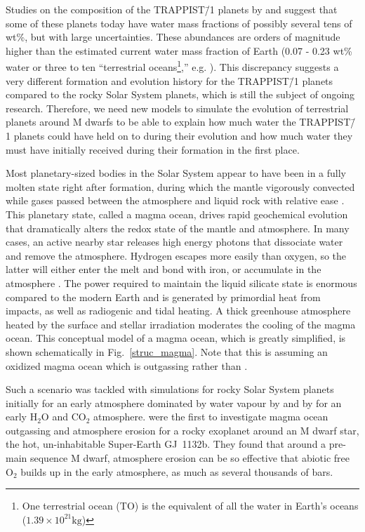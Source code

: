 \documentclass[paper=letterpaper,fontsize=12pt,oneside,twocolumn]{article}
\newcommand{\eg}{e.g. }
\begin{document}
Studies on the composition of the TRAPPIST\=/1 planets by \citet{Dorn2018} and \citet{Unterborn2018} suggest that some of these planets today have water mass fractions of possibly several tens of wt\%, but with large uncertainties. These abundances are orders of magnitude higher than the estimated current water mass fraction of Earth (0.07 - 0.23 wt\% water or three to ten ``terrestrial oceans\footnote{One terrestrial ocean (TO) is the equivalent of all the water in Earth's oceans ($1.39 \times 10^{21} \si{\kilogram}$)},'' \eg \citet{Elkins-Tanton2008,Pearson2014,Schmandt1265}). This discrepancy suggests a very different formation and evolution history for the TRAPPIST\=/1 planets compared to the rocky Solar System planets, which is still the subject of ongoing research.
Therefore, we need new models to simulate the evolution of terrestrial planets around M dwarfs to be able to explain how much water the TRAPPIST\=/1 planets could have held on to during their evolution and how much water they must have initially received during their formation in the first place.

Most planetary-sized bodies in the Solar System appear to have been in a fully molten state right after formation, during which the mantle vigorously convected while gases passed between the atmosphere and liquid rock with relative ease \citep{Wood1970, Solomon1979, Wetherill1990, Lammer2018A}. 
This planetary state, called a magma ocean, drives rapid geochemical evolution that dramatically alters the redox state of the mantle and atmosphere. 
In many cases, an active nearby star releases high energy photons that dissociate water and remove the atmosphere. Hydrogen escapes more easily than oxygen, so the latter will either enter the melt and bond with iron, or accumulate in the atmosphere \citep[\eg][]{Luger2015a}. The power required to maintain the liquid silicate state is enormous compared to the modern Earth and is generated by primordial heat from impacts, as well as radiogenic and tidal heating. A thick greenhouse atmosphere heated by the surface and stellar irradiation moderates the cooling of the magma ocean. This conceptual model of a magma ocean, which is greatly simplified, is shown schematically in Fig.~\ref{struc_magma}. Note that this is assuming an oxidized magma ocean which is outgassing  rather than .

Such a scenario was tackled with simulations for rocky Solar System planets initially for an early atmosphere dominated by water vapour by \citet{Matsui1986,Zahnle1988,Abe1993,Abe1997,Solomatov2000,Zahnle2015} and by \citet{Elkins-Tanton2008} for an early $\mathrm{H_2O}$ and $\mathrm{CO_2}$ atmosphere.
\citet{Schaefer2016} were the first to investigate magma ocean outgassing and atmosphere erosion for a rocky exoplanet around an M dwarf star, the hot, un-inhabitable Super-Earth GJ~1132b.
They found that around a pre-main sequence M dwarf, atmosphere erosion can be so effective that abiotic free $\mathrm{O_2}$ builds up in the early atmosphere, as much as several thousands of bars. 
\end{document}
